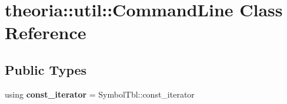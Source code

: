 \hypertarget{classtheoria_1_1util_1_1CommandLine}{}\section{theoria\+:\+:util\+:\+:Command\+Line Class Reference}
\label{classtheoria_1_1util_1_1CommandLine}
\subsection*{Public Types}
\begin{DoxyCompactItemize}
\item 
\mbox{\label{classtheoria_1_1util_1_1CommandLine_a729aa00feedd8257d4caafc73ac6ee63}} 
using {\bfseries const\+\_\+iterator} = Symbol\+Tbl\+::const\+\_\+iterator
\end{DoxyCompactItemize}
